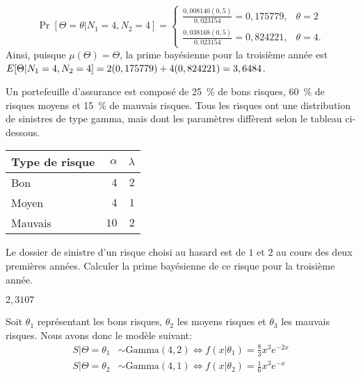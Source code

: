 \begin{exercice}
\begin{sol}
\begin{enumerate}
      \begin{equation*}
        \Pr[\Theta=\theta|N_1=4, N_2=4] =
        \begin{cases}
          \frac{0,008140(0,5)}{0,023154} = 0,175779, & \theta=2 \\
          \frac{0,038168(0,5)}{0,023154} = 0,824221, & \theta=4.
        \end{cases}
      \end{equation*}
      Ainsi, puisque $\mu(\Theta) = \Theta$, la prime bayésienne
      pour la troisième année est $E [ \Theta|N_1=4, N_2=4 ] = 2
      (0,175779) + 4 (0,824221) = 3,6484$.
    \end{enumerate}
  \end{sol}
\end{exercice}

\begin{exercice}
  Un portefeuille d'assurance est composé de 25~\% de bons risques,
  60~\% de risques moyens et 15~\% de mauvais risques. Tous les
  risques ont une distribution de sinistres de type gamma, mais dont
  les paramètres diffèrent selon le tableau ci-dessous.
  \begin{center}
    \begin{tabular}{lrr}
      \toprule
      Type de risque & $\alpha$ & $\lambda$ \\
      \midrule
      Bon     & $4 $ & $2$ \\
      Moyen   & $4 $ & $1$ \\
      Mauvais & $10$ & $2$ \\
      \bottomrule
    \end{tabular}
  \end{center}
  Le dossier de sinistre d'un risque choisi au hasard est de $1$ et
  $2$ au cours des deux premières années. Calculer la prime bayésienne
  de ce risque pour la troisième année.
  \begin{rep}
    $2,3107$
  \end{rep}
  \begin{sol}
    Soit $\theta_1$ représentant les bons risques, $\theta_2$ les
    moyens risques et $\theta_3$ les mauvais risques. Nous avons donc
    le modèle suivant:
    \begin{align*}
      S|\Theta = \theta_1
      &\sim \text{Gamma}(4, 2) \Leftrightarrow
      f(x|\theta_1) = \frac{8}{3} x^3 e^{-2x} \\
      S|\Theta = \theta_2
      &\sim \text{Gamma}(4, 1) \Leftrightarrow
      f(x|\theta_2) = \frac{1}{6} x^3 e^{-x} \\

\end{align*}
\end{sol}
\end{exercice}
